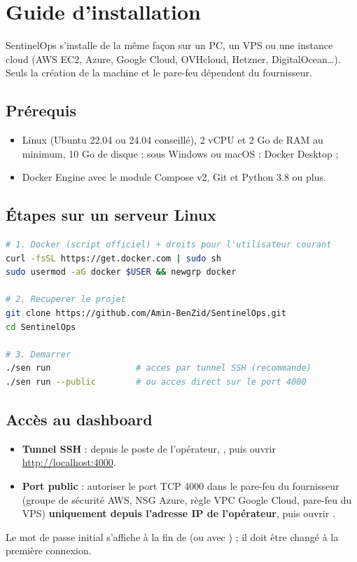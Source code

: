 \chapter{Guide d'installation}
\label{annexe:installation}

SentinelOps s'installe de la même façon sur un PC, un VPS ou une instance cloud (AWS EC2,
Azure, Google Cloud, OVHcloud, Hetzner, DigitalOcean\ldots). Seuls la création de la machine
et le pare-feu dépendent du fournisseur.

\section*{Prérequis}
\begin{itemize}
  \item Linux (Ubuntu 22.04 ou 24.04 conseillé), 2 vCPU et 2 Go de RAM au minimum, 10 Go de
        disque ; sous Windows ou macOS : Docker Desktop ;
  \item Docker Engine avec le module Compose v2, Git et Python 3.8 ou plus.
\end{itemize}

\section*{Étapes sur un serveur Linux}
\begin{lstlisting}[language=bash,caption={Installation sur un serveur Linux},label={lst:install}]
# 1. Docker (script officiel) + droits pour l'utilisateur courant
curl -fsSL https://get.docker.com | sudo sh
sudo usermod -aG docker $USER && newgrp docker

# 2. Recuperer le projet
git clone https://github.com/Amin-BenZid/SentinelOps.git
cd SentinelOps

# 3. Demarrer
./sen run                 # acces par tunnel SSH (recommande)
./sen run --public        # ou acces direct sur le port 4000
\end{lstlisting}

\section*{Accès au dashboard}
\begin{itemize}
  \item \textbf{Tunnel SSH} : depuis le poste de l'opérateur,
        , puis ouvrir
        \url{http://localhost:4000}.
  \item \textbf{Port public} : autoriser le port TCP 4000 dans le pare-feu du fournisseur
        (groupe de sécurité AWS, NSG Azure, règle VPC Google Cloud, pare-feu du VPS)
        \textbf{uniquement depuis l'adresse IP de l'opérateur}, puis ouvrir
        .
\end{itemize}

Le mot de passe initial s'affiche à la fin de  (ou avec ) ; il
doit être changé à la première connexion.

